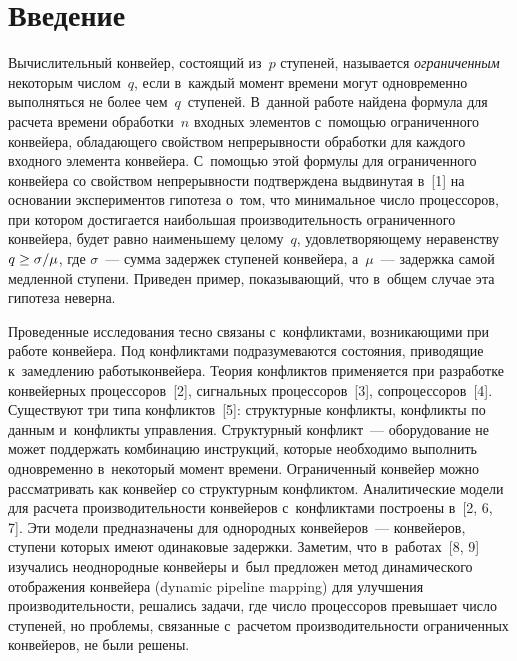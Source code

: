 
  
\vspace*{-3pt}



\thispagestyle{headings}

\begin{multicols}{2}

\label{st\stat}

\section{Введение}

  Вычислительный конвейер, состоящий из~$p$ ступеней, называется 
\textit{ограниченным} некоторым чис\-лом~$q$, если в~каждый момент 
времени могут одновременно выполняться не более чем~$q$~ступеней. 
В~данной работе найдена формула для расчета времени обработки~$n$ 
входных элементов с~помощью ограниченного конвейера, обладающего 
свойством непрерывности обработки для каждого входного элемента 
конвейера. С~по\-мощью этой формулы для ограниченного конвейера со 
свойством непрерывности подтверждена выдвинутая в~[1] на основании 
экспериментов гипотеза о~том, что минимальное число процессоров, при 
котором достигается наибольшая производительность ограниченного 
конвейера, будет равно наименьшему целому~$q$, удовлетворяющему 
неравенству $q\hm\geq \sigma/\mu$, где $\sigma$~--- сумма задержек 
ступеней конвейера, а~$\mu$~--- задержка самой медленной ступени. 
Приведен пример, показывающий, что в~общем случае эта гипотеза неверна.
  
  Проведенные исследования тесно связаны с~конфликтами, 
возникающими при работе конвейера. Под конфликтами подразумеваются 
со\-стояния, приводящие к~замедлению работы\linebreak конвейера. Тео\-рия 
конфликтов применяется при разработке конвейерных процессоров~[2], 
сигнальных процессоров~[3], сопроцессоров~[4]. Существуют три типа 
конфликтов~[5]: структурные конфликты, конфликты по данным 
и~конфликты управления. Структурный конфликт~--- оборудование не 
может поддержать комбинацию инструкций, которые необходимо 
выполнить одновременно в~некоторый момент времени. Ограниченный 
конвейер можно рассматривать как конвейер со структурным конфликтом. 
Аналитические модели для расчета производительности конвейеров 
с~конфликтами построены в~[2, 6, 7]. Эти модели предназначены для 
однородных конвейеров~--- конвейеров, ступени которых имеют 
одинаковые задержки. Заметим, что в~работах~[8, 9] изучались 
неоднородные конвейеры и~был предложен метод динамического 
отоб\-ра\-же\-ния конвейера (dynamic pipeline mapping) для улучшения 
про\-из\-во\-ди\-тель\-ности, решались задачи, где чис\-ло процессоров превышает 
число ступеней, но проб\-ле\-мы, связанные с~расчетом про\-из\-во\-ди\-тель\-ности 
ограниченных конвейеров, не были решены. 


\end{multicols}

